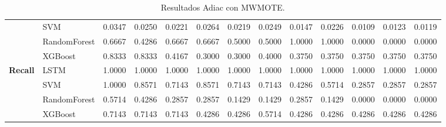 \begin{table}[h]
\begin{adjustbox}{max width=15cm}
\begin{tabular}{|c|l|r|r|r|r|r|r|r|r|r|r|r|}
			& SVM &  0.0347 &  0.0250 &  0.0221 &  0.0264 &  0.0219 &  0.0249 &  0.0147 &  0.0226 &  0.0109 &  0.0123 &  0.0119 \\
			& RandomForest &  0.6667 &  0.4286 &  0.6667 &  0.6667 &  0.5000 &  0.5000 &  1.0000 &  1.0000 &  0.0000 &  0.0000 &  0.0000 \\
			& XGBoost &  0.8333 &  0.8333 &  0.4167 &  0.3000 &  0.3000 &  0.4000 &  0.3750 &  0.3750 &  0.3750 &  0.3750 &  0.3750 \\
			\hline
			\textbf{Recall} & LSTM &  1.0000 &  1.0000 &  1.0000 &  1.0000 &  1.0000 &  1.0000 &  1.0000 &  1.0000 &  1.0000 &  1.0000 &  1.0000 \\
			& SVM &  1.0000 &  0.8571 &  0.7143 &  0.8571 &  0.7143 &  0.7143 &  0.4286 &  0.5714 &  0.2857 &  0.2857 &  0.2857 \\
			& RandomForest &  0.5714 &  0.4286 &  0.2857 &  0.2857 &  0.1429 &  0.1429 &  0.2857 &  0.1429 &  0.0000 &  0.0000 &  0.0000 \\
			& XGBoost &  0.7143 &  0.7143 &  0.7143 &  0.4286 &  0.4286 &  0.5714 &  0.4286 &  0.4286 &  0.4286 &  0.4286 &  0.4286 \\
			\hline
		\end{tabular}
	\end{adjustbox}
	\caption{Resultados Adiac con MWMOTE.}
	\label{tab:Adiac_MWMOTE}
\end{table}
\newpage
